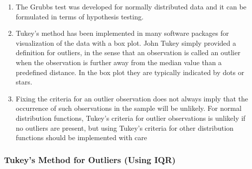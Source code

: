 \begin{enumerate}
    \item The Grubbs test was developed for normally distributed data and it can be formulated in terms of hypothesis testing.
    \hfill \cite{statistics/book/Statistics-for-Data-Scientists/Maurits-Kaptein}

    \item Tukey’s method has been implemented in many software packages for visualization of the data with a box plot. 
    John Tukey simply provided a definition for outliers, in the sense that an observation is called an outlier when the observation is further away from the median value than a predefined distance. 
    In the box plot they are typically indicated by dots or stars.
    \hfill \cite{statistics/book/Statistics-for-Data-Scientists/Maurits-Kaptein}

    \item Fixing the criteria for an outlier observation does not always imply that the occurrence of such observations in the sample will be unlikely. 
    For normal distribution functions, Tukey’s criteria for outlier observations is unlikely if no outliers are present, but using Tukey’s criteria for other distribution functions should be implemented with care
    \hfill \cite{statistics/book/Statistics-for-Data-Scientists/Maurits-Kaptein}
\end{enumerate}



\subsubsection{Tukey’s Method for Outliers (Using IQR)}

